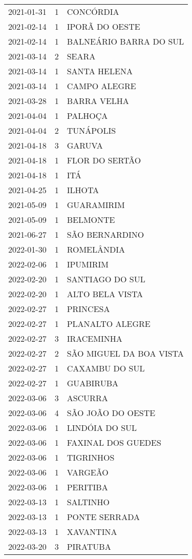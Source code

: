 \begin{longtable}[htbp]{ccl}
2021-01-31 & 1 & CONCÓRDIA \\
2021-02-14 & 1 & IPORÃ DO OESTE \\
2021-02-14 & 1 & BALNEÁRIO BARRA DO SUL \\
2021-03-14 & 2 & SEARA \\
2021-03-14 & 1 & SANTA HELENA \\
2021-03-14 & 1 & CAMPO ALEGRE \\
2021-03-28 & 1 & BARRA VELHA \\
2021-04-04 & 1 & PALHOÇA \\
2021-04-04 & 2 & TUNÁPOLIS \\
2021-04-18 & 3 & GARUVA \\
2021-04-18 & 1 & FLOR DO SERTÃO \\
2021-04-18 & 1 & ITÁ \\
2021-04-25 & 1 & ILHOTA \\
2021-05-09 & 1 & GUARAMIRIM \\
2021-05-09 & 1 & BELMONTE \\
2021-06-27 & 1 & SÃO BERNARDINO \\
2022-01-30 & 1 & ROMELÂNDIA \\
2022-02-06 & 1 & IPUMIRIM \\
2022-02-20 & 1 & SANTIAGO DO SUL \\
2022-02-20 & 1 & ALTO BELA VISTA \\
2022-02-27 & 1 & PRINCESA \\
2022-02-27 & 1 & PLANALTO ALEGRE \\
2022-02-27 & 3 & IRACEMINHA \\
2022-02-27 & 2 & SÃO MIGUEL DA BOA VISTA \\
2022-02-27 & 1 & CAXAMBU DO SUL \\
2022-02-27 & 1 & GUABIRUBA \\
2022-03-06 & 3 & ASCURRA \\
2022-03-06 & 4 & SÃO JOÃO DO OESTE \\
2022-03-06 & 1 & LINDÓIA DO SUL \\
2022-03-06 & 1 & FAXINAL DOS GUEDES \\
2022-03-06 & 1 & TIGRINHOS \\
2022-03-06 & 1 & VARGEÃO \\
2022-03-06 & 1 & PERITIBA \\
2022-03-13 & 1 & SALTINHO \\
2022-03-13 & 1 & PONTE SERRADA \\
2022-03-13 & 1 & XAVANTINA \\
2022-03-20 & 3 & PIRATUBA \\

\end{longtable}
